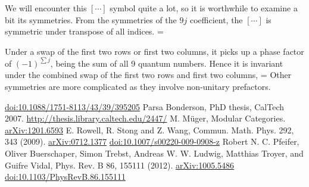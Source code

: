 \documentclass[12pt]{article}
\newcommand{\doi}[1]{\href{https://dx.doi.org/#1}{doi:#1}}
\newcommand{\arxiv}[1]{\href{https://arxiv.org/abs/#1}{arXiv:#1}}
\begin{document}
We will encounter this $[\cdots]$ symbol quite a lot, so it is worthwhile to examine a bit its symmetries.
From the symmetries of the $9j$ coefficient, the $[\cdots]$ is symmetric under transpose of all indices.
\beq
{}
=
\eeq

Under a swap of the first two rows or first two columns, it picks up a phase factor of $(-1)^{\sum j}$,
being the sum of all 9 quantum numbers. Hence it is invariant under the combined swap of the first two
rows and first two columns,
\beq
{}
=
\eeq
Other symmetries are more complicated as they involve non-unitary prefactors.

\begin{thebibliography}{99}
 \doi{10.1088/1751-8113/43/39/395205}
 Parsa Bonderson, PhD thesis, CalTech 2007.  \url{http://thesis.library.caltech.edu/2447/}
 M. M\"uger, Modular Categories. \arxiv{1201.6593}
 E. Rowell, R. Stong and Z. Wang, Commun. Math. Phys. 292, 343 (2009).
\arxiv{0712.1377}
\doi{10.1007/s00220-009-0908-z}
 Robert N. C. Pfeifer, Oliver Buerschaper, Simon Trebst, Andreas W. W. Ludwig, 
Matthias Troyer, and Guifre Vidal, Phys. Rev. B 86, 155111 (2012).
\arxiv{1005.5486}
\doi{10.1103/PhysRevB.86.155111}

\end{thebibliography}
\end{document}
